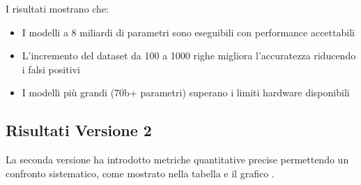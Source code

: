 \documentclass[12pt]{report}
\begin{document}
I risultati mostrano che:
\begin{itemize}
    \item I modelli a 8 miliardi di parametri sono eseguibili con performance accettabili
    \item L'incremento del dataset da 100 a 1000 righe migliora l'accuratezza riducendo i falsi positivi
    \item I modelli più grandi (70b+ parametri) superano i limiti hardware disponibili
\end{itemize}

\subsection{Risultati Versione 2}
\label{subsec:risultati_v2}

La seconda versione ha introdotto metriche quantitative precise permettendo un confronto sistematico, come mostrato nella tabella  e il grafico .
\end{document}
